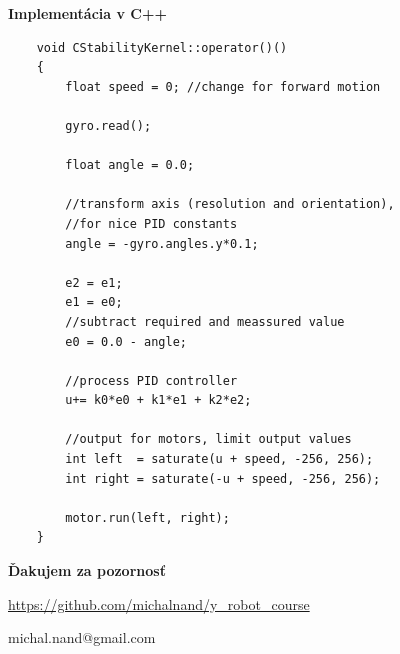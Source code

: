 \documentclass[xcolor=dvipsnames]{beamer}
\begin{document}
\begin{frame}[fragile]{\bf Implementácia v C++}
    \begin{lstlisting}
    void CStabilityKernel::operator()()
    {
        float speed = 0; //change for forward motion

        gyro.read();

        float angle = 0.0;

        //transform axis (resolution and orientation),
        //for nice PID constants
        angle = -gyro.angles.y*0.1;

        e2 = e1;
        e1 = e0;
        //subtract required and meassured value
        e0 = 0.0 - angle;

        //process PID controller
        u+= k0*e0 + k1*e1 + k2*e2;

        //output for motors, limit output values
        int left  = saturate(u + speed, -256, 256);
        int right = saturate(-u + speed, -256, 256);

        motor.run(left, right);
    }
    \end{lstlisting}
\end{frame}


\begin{frame}{\bf Ďakujem za pozornosť}

\url {https://github.com/michalnand/y_robot_course}
\centerline{michal.nand@gmail.com}

\end{frame}
\end{document}
